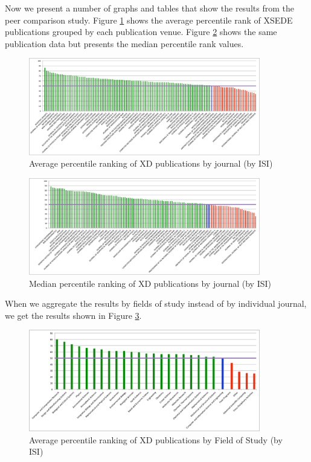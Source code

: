\documentclass{sig-alternate}
\begin{document}
Now we present a number of graphs and tables that show the results
from the peer comparison study. Figure \ref{F:isi_peers_byj_mean}
shows the average percentile rank of XSEDE publications grouped by
each publication venue. Figure \ref{F:isi_peers_byj_median} shows the
same publication data but presents the median percentile rank values.

\begin{figure}[htb!]
  \centering
    \includegraphics[width=0.9\textwidth]{images/isi_peers_byj_mean.pdf}
    \caption{Average percentile ranking of XD publications by journal (by ISI)}
    \label{F:isi_peers_byj_mean}
\end{figure}

\begin{figure}[htb!]
  \centering
    \includegraphics[width=0.9\textwidth]{images/isi_peers_byj_median.pdf}
    \caption{Median percentile ranking of XD publications by journal (by ISI)}
    \label{F:isi_peers_byj_median}
\end{figure}

When we aggregate the results by fields of study instead of by
individual journal, we get the results shown in Figure
\ref{F:isi_peers_fos}.

\begin{figure}[htb!]
  \centering
    \includegraphics[width=0.9\textwidth]{images/isi_peers_fos.pdf}
    \caption{Average percentile ranking of XD publications by Field of Study (by ISI)}
    \label{F:isi_peers_fos}
\end{figure}
\end{document}
